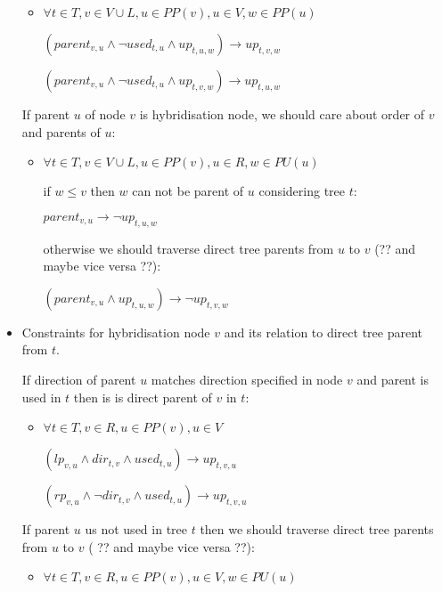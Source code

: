 \documentclass[runningheads, envcountsame, a4paper]{llncs}
\begin{document}
\begin{itemize}
	\begin{itemize}
    \item $\forall t \in T,v \in V \cup L, u \in PP(v), u \in V, w \in PP(u)$
    
	$(parent_{v,u} \wedge \neg used_{t,u} \wedge up_{t,u,w}) \rightarrow up_{t,v,w}$
    
    $(parent_{v,u} \wedge \neg used_{t,u} \wedge up_{t,v,w}) \rightarrow up_{t,u,w}$
	\end {itemize}
	
	If parent $u$ of node $v$ is hybridisation node, we should care about order of $v$ and parents of $u$:

	\begin{itemize}
    \item $\forall t \in T,v \in V \cup L, u \in PP(v), u \in R, w \in PU(u)$

	if $w \leq v$ then $w$ can not be parent of $u$ considering tree $t$:
	
	$parent_{v,u} \rightarrow \neg up_{t,u,w}$
	
	otherwise we should traverse direct tree parents from $u$ to $v$ (?? and maybe vice versa ??):
	
	$(parent_{v,u} \wedge up_{t,u,w}) \rightarrow \neg up_{t,v,w}$
    \end{itemize}

\item Constraints for hybridisation node $v$ and its relation to direct tree parent from $t$.

	If direction of parent $u$ matches direction specified in node $v$ and parent is used in $t$ then is is direct parent of $v$ in $t$:

    \begin{itemize}
    \item $\forall t \in T, v \in R, u \in PP(v), u \in V$
	
	$(lp_{v,u} \wedge dir_{t,v} \wedge used_{t,u}) \rightarrow up_{t,v,u}$
    
    $(rp_{v,u} \wedge \neg dir_{t,v} \wedge used_{t,u}) \rightarrow up_{t,v,u}$
	\end {itemize}
	
	If parent $u$ us not used in tree $t$ then we should traverse direct tree parents from $u$ to $v$ ( ?? and maybe vice versa ??):

    \begin{itemize}
    \item $\forall t \in T, v \in R, u \in PP(v), u \in V, w \in PU(u)$
	

\end{itemize}
\end{itemize}
\end{document}
